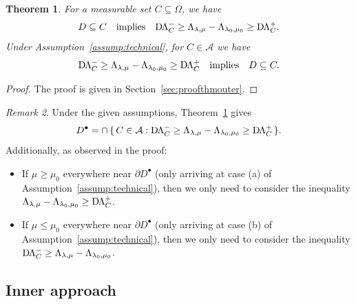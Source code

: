 \documentclass[reqno]{amsart}
\numberwithin{equation}{section}
\numberwithin{figure}{section}
\numberwithin{table}{section}
\newcommand{\DLambda}{\textup{D}\mkern-1.5mu \Lambda}
\theoremstyle{definition}
\theoremstyle{plain}
\newtheorem{thm}{Theorem}[section]
\theoremstyle{definition}
\theoremstyle{remark}
\newtheorem{rem}[thm]{Remark}
\numberwithin{equation}{section}
\begin{document}
\begin{thm} \label{thm:outer} 
	For a measurable  set $C\subseteq\Omega$, we have
	\begin{equation*}
		D\subseteq C \quad \text{implies} \quad \DLambda_C^- \geq \Lambda_{\lambda,\mu} - \Lambda_{\lambda_0,\mu_0} \geq \DLambda_C^+.
	\end{equation*}
	Under Assumption~\ref{assump:technical}, for $C\in\mathcal{A}$ we have
	\begin{equation*}
		\DLambda_C^- \geq \Lambda_{\lambda,\mu}-\Lambda_{\lambda_0,\mu_0} \geq \DLambda_C^+ \quad \text{implies} \quad D\subseteq C.
	\end{equation*}
\end{thm}
%
\begin{proof}
	The proof is given in Section~\ref{sec:proofthmouter}.
\end{proof}
%
\begin{rem}
	Under the given assumptions, Theorem~\ref{thm:outer} gives
	\begin{equation*}
		D^\bullet = \cap\,\{\, C\in\mathcal{A} : \DLambda_C^- \geq \Lambda_{\lambda,\mu}-\Lambda_{\lambda_0,\mu_0} \geq \DLambda_C^+ \,\}.
	\end{equation*}
	Additionally, as observed in the proof:
	\begin{itemize}
		\item[$\diamond$] If $\mu\geq\mu_0$ everywhere near $\partial D^\bullet$ (only arriving at case (a) of Assumption~\ref{assump:technical}), then we only need to consider the inequality $\Lambda_{\lambda,\mu}-\Lambda_{\lambda_0,\mu_0} \geq \DLambda_C^+$. 
		\item[$\diamond$] If $\mu\leq\mu_0$ everywhere near $\partial D^\bullet$ (only arriving at case (b) of Assumption~\ref{assump:technical}), then we only need to consider the inequality $\DLambda_C^- \geq
		\Lambda_{\lambda,\mu}-\Lambda_{\lambda_0,\mu_0}$. 
	\end{itemize}
\end{rem}

\subsection{Inner approach}
\end{document}
